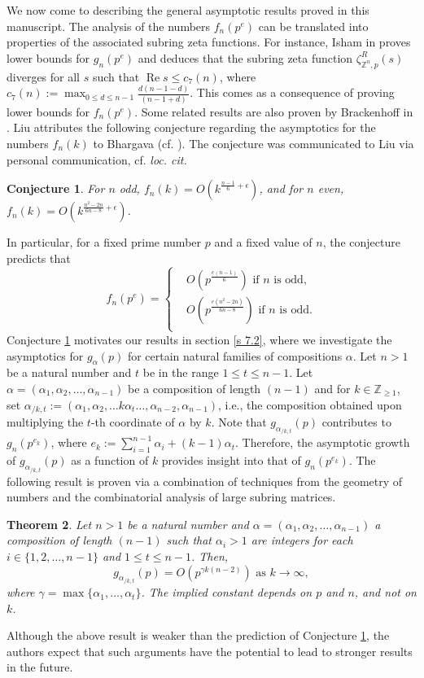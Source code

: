 \documentclass[a4paper]{amsart}
\newtheorem{theorem}{Theorem}[section]
\newtheorem{conjecture}[theorem]{Conjecture}
\numberwithin{equation}{section}
\theoremstyle{remark}
\newcommand{\Z}{\mathbb{Z}}
\newcommand{\op}[1]{\operatorname{#1}}
\begin{document}
 \par We now come to describing the general asymptotic results proved in this manuscript. The analysis of the numbers $f_n(p^e)$ can be translated into properties of the associated subring zeta functions. For instance, Isham in \cite{ishamlowerbound} proves lower bounds for $g_n(p^e)$ and deduces that the subring zeta function $\zeta_{\Z^n,p}^R(s)$ diverges for all $s$ such that $\op{Re}s\leq c_7(n)$, where $c_7(n):=\op{max}_{0\leq d \leq n-1} \frac{d(n-1-d)}{(n-1+d)}$. This comes as a consequence of proving lower bounds for $f_n(p^e)$. Some related results are also proven by Brackenhoff in \cite{brakenhoff2009counting}. Liu attributes the following conjecture regarding the asymptotics for the numbers $f_n(k)$ to Bhargava (cf. \cite[p.298]{liu2007counting}). The conjecture was communicated to Liu via personal communication, cf. \emph{loc. cit.}
 \begin{conjecture}\label{bharagava conjecture}
 For $n$ odd, $f_n(k)=O(k^{\frac{n-1}{6}+\epsilon})$, and for $n$ even, $f_n(k)=O(k^{\frac{n^2-2n}{6n-8}+\epsilon})$.
 \end{conjecture} In particular, for a fixed prime number $p$ and a fixed value of $n$, the conjecture predicts that 
 \[f_n(p^e)=\begin{cases} & O(p^{\frac{e(n-1)}{6}})\text{ if }n\text{ is odd,}\\
 & O(p^{\frac{e(n^2-2n)}{6n-8}})\text{ if }n\text{ is odd.}\\
 \end{cases}\]Conjecture \ref{bharagava conjecture} motivates our results in section \ref{s 7.2}, where we investigate the asymptotics for $g_\alpha(p)$ for certain natural families of compositions $\alpha$. Let $n > 1$ be a natural number and $t$ be in the range $1\leq t\leq n-1$. Let $\alpha = (\alpha_1,\alpha_2,\dots,\alpha_{n-1})$ be a composition of length $(n-1)$ and for $k \in \Z_{\geq 1}$, set $\alpha_{/k,t} := (\alpha_1,\alpha_2,\dots k\alpha_t\dots,\alpha_{n-2},\alpha_{n-1})$, i.e., the composition obtained upon multiplying the $t$-th coordinate of $\alpha$ by $k$. Note that $g_{\alpha_{/k,t}}(p)$ contributes to $g_n(p^{e_k})$, where $e_k:=\sum_{i=1}^{n-1}\alpha_i+(k-1)\alpha_t$. Therefore, the asymptotic growth of $g_{\alpha_{/k,t}}(p)$ as a function of $k$ provides insight into that of $g_n(p^{e_k})$. The following result is proven via a combination of techniques from the geometry of numbers and the combinatorial analysis of large subring matrices.
\begin{theorem}\label{main2}
 Let $n > 1$ be a natural number and $\alpha = (\alpha_1,\alpha_2,\dots,\alpha_{n-1})$ a composition of length $(n-1)$ such that $\alpha_i > 1$ are integers for each $i \in \{1,2,\dots,n-1\}$ and $1 \leq t\leq n-1$. Then,
 \[g_{\alpha_{/k,t}}(p) = O(p^{\gamma k(n-2)})\text{ as }k \to \infty,\]
 where $\gamma = \max\{\alpha_1,\dots,\alpha_{t}\}$. The implied constant depends on $p$ and $n$, and not on $k$.
\end{theorem}
Although the above result is weaker than the prediction of Conjecture \ref{bharagava conjecture}, the authors expect that such arguments have the potential to lead to stronger results in the future.
\end{document}
